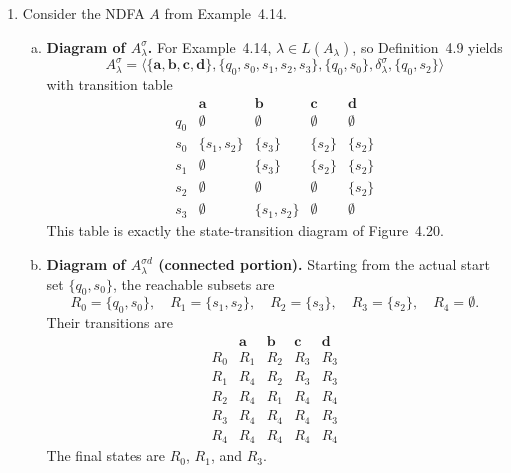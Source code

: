 \begin{enumerate}[{4.}1.]
Here $r_i$ means that recording is on and the last $i$ scanned bits match the
first $i$ bits of $\pmb{000111}$.  Thus $r_5\xrightarrow{\pmb{1}}s_0$ turns the
recorder off exactly when the full EOT signal $\pmb{000111}$ has just been
seen, while every other input keeps the machine in one of the final recording
states.

\item Consider the NDFA $A$ from Example~4.14.

\begin{enumerate}[(a)]
  \item \textbf{Diagram of $A^{\sigma}_\lambda$.}
  For Example~4.14, $\lambda\in L(A_\lambda)$, so Definition~4.9 yields
  \[
    A^{\sigma}_\lambda=
    \langle\{\pmb{a},\pmb{b},\pmb{c},\pmb{d}\},
    \{q_0,s_0,s_1,s_2,s_3\},\{q_0,s_0\},\delta^{\sigma}_\lambda,\{q_0,s_2\}\rangle
  \]
  with transition table
  \[
  \begin{array}{c|cccc}
   & \pmb{a} & \pmb{b} & \pmb{c} & \pmb{d}\\\hline
  q_0 & \emptyset & \emptyset & \emptyset & \emptyset\\
  s_0 & \{s_1,s_2\} & \{s_3\} & \{s_2\} & \{s_2\}\\
  s_1 & \emptyset & \{s_3\} & \{s_2\} & \{s_2\}\\
  s_2 & \emptyset & \emptyset & \emptyset & \{s_2\}\\
  s_3 & \emptyset & \{s_1,s_2\} & \emptyset & \emptyset
  \end{array}
  \]
  This table is exactly the state-transition diagram of Figure~4.20.

  \item \textbf{Diagram of $A^{\sigma d}_\lambda$ (connected portion).}
  Starting from the actual start set $\{q_0,s_0\}$, the reachable subsets are
  \[
    R_0=\{q_0,s_0\},\quad
    R_1=\{s_1,s_2\},\quad
    R_2=\{s_3\},\quad
    R_3=\{s_2\},\quad
    R_4=\emptyset.
  \]
  Their transitions are
  \[
  \begin{array}{c|cccc}
   & \pmb{a} & \pmb{b} & \pmb{c} & \pmb{d}\\\hline
  R_0 & R_1 & R_2 & R_3 & R_3\\
  R_1 & R_4 & R_2 & R_3 & R_3\\
  R_2 & R_4 & R_1 & R_4 & R_4\\
  R_3 & R_4 & R_4 & R_4 & R_3\\
  R_4 & R_4 & R_4 & R_4 & R_4
  \end{array}
  \]
  The final states are $R_0$, $R_1$, and $R_3$.
\end{enumerate}


\end{enumerate}
